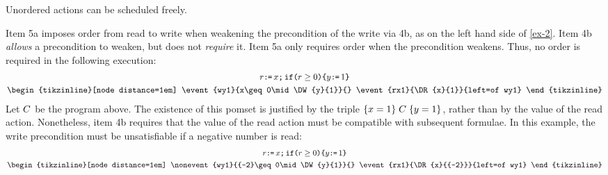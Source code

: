 Unordered actions can be scheduled freely.


Item 5a imposes order from read to write when weakening the
precondition of the write via 4b, as on the left hand side of
\eqref{ex-2}.
Item 4b \emph{allows} a precondition to weaken, but does not \emph{require} it.
Item 5a only requires order when the precondition weakens.
Thus, no order is required in the following execution:
\begin{gather*}
  r\GETS x\SEMI\IF{r\geq0}\THEN y\GETS1 \FI
  \\
  \hbox{\begin{tikzinline}[node distance=1em]
      \event{wy1}{x\geq0\mid\DW{y}{1}}{}
      \event{rx1}{\DR{x}{1}}{left=of wy1}
    \end{tikzinline}}
\end{gather*}
Let $C$ be the program above.  The existence of this pomset is justified
by the triple $\{x=1\}\allowbreak\;C\;\allowbreak\{y=1\}$, rather than by the value of the read
action.  Nonetheless, item 4b requires that the value of the read action must
be compatible with subsequent formulae.  In this example, the write
precondition must be unsatisfiable if a negative number is read:
\begin{gather*}
  r\GETS x\SEMI\IF{r\geq0}\THEN y\GETS1 \FI
  \\
  \hbox{\begin{tikzinline}[node distance=1em]
      \nonevent{wy1}{{-2}\geq0\mid\DW{y}{1}}{}
      \event{rx1}{\DR{x}{{-2}}}{left=of wy1}
    \end{tikzinline}}
\end{gather*}

